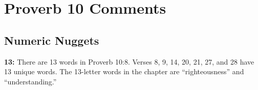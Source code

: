 \section{Proverb 10 Comments}

\subsection{Numeric Nuggets}
\textbf{13:} There are 13 words in Proverb 10:8. Verses 8, 9, 14, 20, 21, 27, and 28 have 13 unique words. The 13-letter words in the chapter are ``righteousness'' and ``understanding.''  

